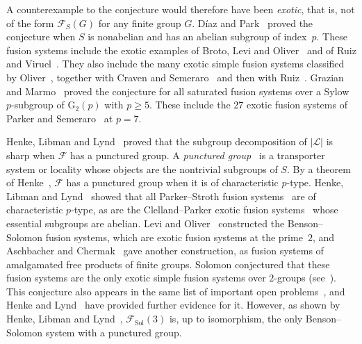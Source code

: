 \documentclass[10pt]{amsart}
\theoremstyle{definition}
\numberwithin{equation}{section}
\renewcommand{\ge}{\geqslant}
\newcommand{\F}{\mathcal F}
\begin{document}
A counterexample to the conjecture would therefore have been \emph{exotic}, that is, not of the form $\F_S(G)$ for any finite group $G$. D\'iaz and Park~\cite[Theorem~C]{DP} proved the conjecture when $S$ is nonabelian and has an abelian subgroup of index~$p$. These fusion systems include the exotic examples of Broto, Levi and Oliver~\cite[\S9]{BLO} and of Ruiz and Viruel~\cite{RV2004}. They also include the many exotic simple fusion systems classified by Oliver~\cite{Oliver2014}, together with Craven and Semeraro~\cite{COS2017} and then with Ruiz~\cite{OR2020}. Grazian and Marmo~\cite[Theorem~A]{GM} proved the conjecture for all saturated fusion systems over a Sylow $p$-subgroup of $\mathrm{G}_2(p)$ with $p\ge5$. These include the $27$ exotic fusion systems of Parker and Semeraro~\cite{PS2018} at $p=7$.

Henke, Libman and Lynd~\cite[Theorem~1.1]{HLL} proved that the subgroup decomposition of $|\mathcal L|$ is sharp when $\F$ has a punctured group. A \emph{punctured group}~\cite[Definition~2.16]{HLL} is a transporter system or locality whose objects are the nontrivial subgroups of $S$. By a theorem of Henke~\cite[Theorem~A]{Henke2019}, $\F$ has a punctured group when it is of characteristic $p$-type. Henke, Libman and Lynd~\cite[Theorem~5.2(c),(d)]{HLL} showed that all Parker--Stroth fusion systems~\cite{PS2015} are of characteristic $p$-type, as are the Clelland--Parker exotic fusion systems~\cite{CP2010} whose essential subgroups are abelian. Levi and Oliver~\cite{LO2002} constructed the Benson--Solomon fusion systems, which are exotic fusion systems at the prime~$2$, and Aschbacher and Chermak~\cite{AC2010} gave another construction, as fusion systems of amalgamated free products of finite groups. Solomon conjectured that these fusion systems are the only exotic simple fusion systems over $2$-groups (see~\cite[Conjecture~57.12]{Guido}). This conjecture also appears in the same list of important open problems~\cite[\S III.7]{AKO}, and Henke and Lynd~\cite{HL2022} have provided further evidence for it. However, as shown by Henke, Libman and Lynd~\cite[Theorem~1.4]{HLL}, $\F_{\mathrm{Sol}}(3)$ is, up to isomorphism, the only Benson--Solomon system with a punctured group.
\end{document}
